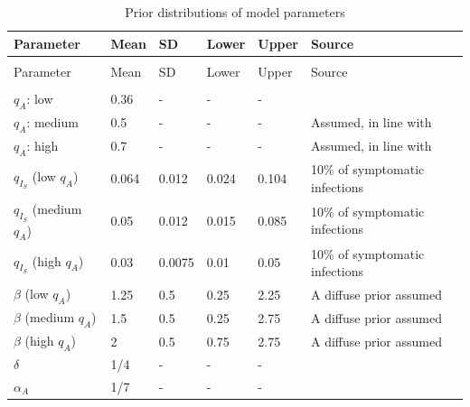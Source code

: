\documentclass[11pt]{article}
\begin{document}
\begin{spacing}{.9}
	\begin{longtable}[H] {p{} p{} p{} p{} p{} p{} }
		\caption{Prior distributions of model parameters} \\
		Parameter & Mean & SD & Lower & Upper & Source   \\[0.5em] \hline
		{} & {} & {} & {} & {} & {} \\
		\endfirsthead
		Parameter & Mean & SD & Lower & Upper & Source  \\[0.5em] \hline
		{} & {} & {} & {} & {} & {}  \\
		\endhead
		$q_A$: low & 0.36 & {-} & {-} & {-} & \citep{nishiura2020estimation, mizumoto2020estimating, russell2020estimating}  \\[0.5em]
		$q_A$: medium & 0.5 & {-} & {-} & {-} & Assumed, in line with \citep{he2020estimation, emery2020contribution, kimball2020asymptomatic} \\[0.5em]
		$q_A$: high & 0.7  & {-} & {-} & {-} & Assumed, in line with \citep{he2020estimation, emery2020contribution, kimball2020asymptomatic} \\[0.5em]
		$q_{I_S}$ (low $q_A$) & 0.064 & 0.012 & 0.024 & 0.104 & 10\% of symptomatic infections \citep{verity2020estimates, bi2020epidemiology, salje2020estimating} \\[0.5em]
		$q_{I_S}$ (medium $q_A$) & 0.05 & 0.012 & 0.015 & 0.085 & 10\% of symptomatic infections \citep{verity2020estimates, bi2020epidemiology, salje2020estimating} \\[0.5em]
		$q_{I_S}$ (high $q_A$) & 0.03 & 0.0075 & 0.01 & 0.05 & 10\% of symptomatic infections \citep{verity2020estimates, bi2020epidemiology, salje2020estimating} \\[0.5em]
		$\beta$ (low $q_A$) & 1.25 & 0.5 & 0.25 & 2.25 & A diffuse prior assumed \\[0.5em]
		$\beta$ (medium $q_A$) & 1.5 & 0.5 & 0.25 & 2.75 & A diffuse prior assumed \\[0.5em]
		$\beta$ (high $q_A$) & 2 & 0.5 & 0.75 & 2.75 & A diffuse prior assumed \\[0.5em]
		$\delta$ & 1/4 & {-} & {-} & {-} & \citep{lauer2020incubation, bi2020epidemiology, li2020early, linton2020incubation, he2020estimation, salje2020estimating, wei2020presymptomatic} \\[0.5em]
		$\alpha_A$ & 1/7 & {-} & {-} & {-} & \citep{wolfel2020virological} \\[0.5em]

\end{longtable}
\end{spacing}
\end{document}
